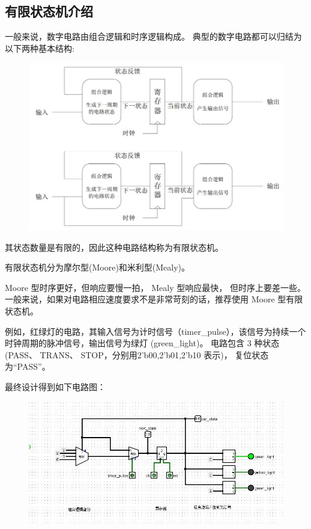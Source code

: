 \documentclass[UTF8]{article}
\begin{document}
	\subsection{有限状态机介绍}
	一般来说，数字电路由组合逻辑和时序逻辑构成。 典型的数字电路都可以归结为以下两种基本结构:\par
	\begin{figure}[H]
		\centering
		\includegraphics[width=0.7\linewidth]{s3_1.jpg}
		\label{s3_1}
	\end{figure}\par
	其状态数量是有限的，因此这种电路结构称为有限状态机。\par
	有限状态机分为摩尔型(Moore)和米利型(Mealy)。\par
	Moore 型时序更好，但响应要慢一拍， Mealy 型响应最快， 但时序上要差一些。一般来说，如果对电路相应速度要求不是非常苛刻的话，推荐使用 Moore 型有限状态机。\par
	例如，红绿灯的电路，其输入信号为计时信号（timer\_pulse），该信号为持续一个时钟周期的脉冲信号，输出信号为绿灯 (green\_light)。 电路包含 3 种状态(PASS、 TRANS、 STOP，分别用2’b00,2’b01,2’b10 表示)， 复位状态为“PASS”。 \par
	最终设计得到如下电路图：\par
	\begin{figure}[H]
		\centering
		\includegraphics[width=0.7\linewidth]{s3_2.jpg}
		\label{s3_2}
	\end{figure}\par
\end{document}
